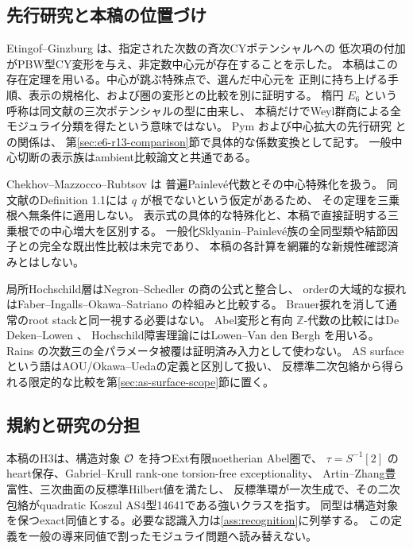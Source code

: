 \documentclass[11pt,a4paper]{ltjsarticle}
\begin{document}
\subsection{先行研究と本稿の位置づけ}
Etingof--Ginzburg \cite[Theorem 3.3.2]{EG} は、指定された次数の斉次CYポテンシャルへの
低次項の付加がPBW型CY変形を与え、非定数中心元が存在することを示した。
本稿はこの存在定理を用いる。中心が跳ぶ特殊点で、選んだ中心元を
正則に持ち上げる手順、表示の規格化、および圏の変形との比較を別に証明する。
楕円 $E_6$ という呼称は同文献の三次ポテンシャルの型に由来し、
本稿だけでWeyl群商による全モジュライ分類を得たという意味ではない。
Pym \cite[\S3.4]{PymR13}および中心拡大の先行研究 \cite{LBS}との関係は、
第\ref{sec:e6-r13-comparison}節で具体的な係数変換として記す。
一般中心切断の表示族はambient比較論文\cite{CompanionAmbient}と共通である。

Chekhov--Mazzocco--Rubtsov \cite[Definition 1.1, (1.5), Theorem 1.5]{CMR} は
普遍Painlev\'e代数とその中心特殊化を扱う。
同文献のDefinition 1.1には $q$ が根でないという仮定があるため、
その定理を三乗根へ無条件に適用しない。
表示式の具体的な特殊化と、本稿で直接証明する三乗根での中心増大を区別する。
一般化Sklyanin--Painlev\'e族の全同型類や結節因子との完全な既出性比較は未完であり、
本稿の各計算を網羅的な新規性確認済みとはしない。

局所Hochschild層はNegron--Schedler \cite{NS} の商の公式と整合し、
orderの大域的な捩れはFaber--Ingalls--Okawa--Satriano \cite{FIOS} の枠組みと比較する。
Brauer捩れを消して通常のroot stackと同一視する必要はない。
Abel変形と有向 $\mathbb Z$-代数の比較にはDe Deken--Lowen \cite{DeDekenLowen}、
Hochschild障害理論にはLowen--Van den Bergh \cite{LVdB,LowenObject} を用いる。
Rains \cite{Rains} の次数三の全パラメータ被覆は証明済み入力として使わない。
AS surfaceという語はAOU/Okawa--Uedaの定義と区別して扱い、
反標準二次包絡から得られる限定的な比較を第\ref{sec:as-surface-scope}節に置く。

\subsection{規約と研究の分担}
本稿のH3は、構造対象 $\mathcal O$ を持つExt有限noetherian Abel圏で、
$\tau=S^{-1}[2]$ のheart保存、Gabriel--Krull rank-one torsion-free exceptionality、
Artin--Zhang豊富性、三次曲面の反標準Hilbert値を満たし、
反標準環が一次生成で、その二次包絡がquadratic Koszul AS4型14641である強いクラスを指す。
同型は構造対象を保つexact同値とする。必要な認識入力は\ref{ass:recognition}に列挙する。
この定義を一般の導来同値で割ったモジュライ問題へ読み替えない。
\end{document}
